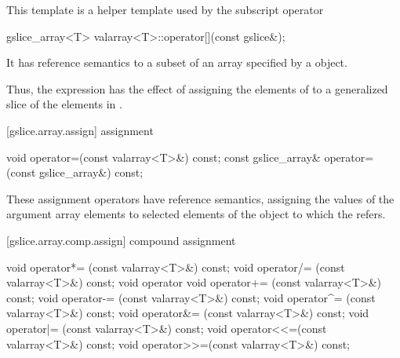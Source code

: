 \pnum
This template is a helper template used by the
subscript operator

%
%
\begin{itemdecl}
gslice_array<T> valarray<T>::operator[](const gslice&);
\end{itemdecl}

\begin{itemdescr}
\pnum
It has reference semantics to a subset of an array specified by a
object.

\pnum
Thus, the expression
has the effect of assigning the elements of
to a
generalized slice of the elements in
.
\end{itemdescr}

[gslice.array.assign]{ assignment}

%
\begin{itemdecl}
void operator=(const valarray<T>&) const;
const gslice_array& operator=(const gslice_array&) const;
\end{itemdecl}

\begin{itemdescr}
\pnum
These assignment operators have reference semantics, assigning the values
of the argument array elements to selected elements of the
object to which the
refers.
\end{itemdescr}

[gslice.array.comp.assign]{ compound assignment}

%
%
%
%
%
%
%
%
%
%
\begin{itemdecl}
void operator*= (const valarray<T>&) const;
void operator/= (const valarray<T>&) const;
void operator%
void operator+= (const valarray<T>&) const;
void operator-= (const valarray<T>&) const;
void operator^= (const valarray<T>&) const;
void operator&= (const valarray<T>&) const;
void operator|= (const valarray<T>&) const;
void operator<<=(const valarray<T>&) const;
void operator>>=(const valarray<T>&) const;
\end{itemdecl}

